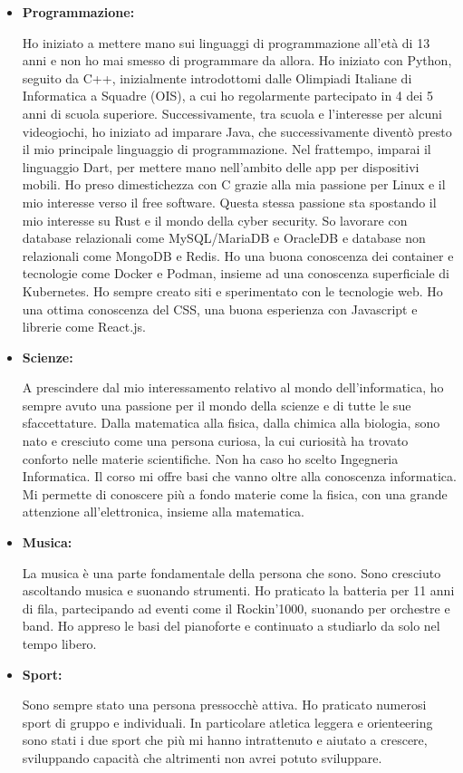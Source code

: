 \documentclass{paper}
\begin{document}
\begin{itemize}
    \item \textbf{Programmazione:}
    
    Ho iniziato a mettere mano sui linguaggi di
    programmazione all'età di 13 anni e non ho mai smesso di
    programmare da allora. Ho iniziato con Python,
    seguito da C++, inizialmente introdottomi dalle Olimpiadi
    Italiane di Informatica a Squadre (OIS), a cui ho
    regolarmente partecipato in 4 dei 5 anni di scuola
    superiore. Successivamente, tra scuola e l'interesse
    per alcuni videogiochi, ho iniziato ad imparare Java,
    che successivamente diventò presto il mio principale
    linguaggio di programmazione. Nel frattempo, imparai
    il linguaggio Dart, per mettere mano nell'ambito delle
    app per dispositivi mobili. Ho preso dimestichezza con
    C grazie alla mia passione per Linux e il mio interesse
    verso il free software. Questa stessa passione sta spostando
    il mio interesse su Rust e il mondo della cyber security.
    So lavorare con database relazionali come MySQL/MariaDB
    e OracleDB e database non relazionali come MongoDB e Redis.
    Ho una buona conoscenza dei container e tecnologie come
    Docker e Podman, insieme ad una conoscenza superficiale di
    Kubernetes. Ho sempre creato siti e sperimentato con le
    tecnologie web. Ho una ottima conoscenza del CSS, una buona
    esperienza con Javascript e librerie come React.js.

    \item \textbf{Scienze:}
    
    A prescindere dal mio interessamento relativo al mondo
    dell'informatica, ho sempre avuto una passione per il mondo
    della scienze e di tutte le sue sfaccettature. Dalla
    matematica alla fisica, dalla chimica alla biologia, sono
    nato e cresciuto come una persona curiosa, la cui curiosità
    ha trovato conforto nelle materie scientifiche. Non ha caso
    ho scelto Ingegneria Informatica. Il corso mi offre basi
    che vanno oltre alla conoscenza informatica. Mi permette
    di conoscere più a fondo materie come la fisica, con una
    grande attenzione all'elettronica, insieme alla matematica.

    \item \textbf{Musica:}
    
    La musica è una parte fondamentale della persona che sono.
    Sono cresciuto ascoltando musica e suonando strumenti.
    Ho praticato la batteria per 11 anni di fila, partecipando
    ad eventi come il Rockin'1000, suonando per orchestre e
    band. Ho appreso le basi del pianoforte e continuato a
    studiarlo da solo nel tempo libero.

    \item \textbf{Sport:}
    
    Sono sempre stato una persona pressocchè attiva.
    Ho praticato numerosi sport di gruppo e individuali.
    In particolare atletica leggera e orienteering sono
    stati i due sport che più mi hanno intrattenuto e aiutato
    a crescere, sviluppando capacità che altrimenti non avrei
    potuto sviluppare.
\end{itemize}
\end{document}
